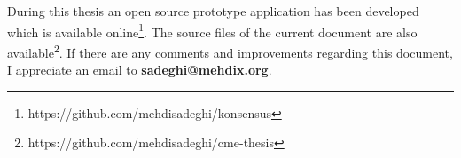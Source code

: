During this thesis an open source prototype application has been developed which is available online\footnote{https://github.com/mehdisadeghi/konsensus}. The source files
of the current document are also available\footnote{https://github.com/mehdisadeghi/cme-thesis}. If there are any comments and improvements regarding this document, I
appreciate an email to \textbf{sadeghi@mehdix.org}.

